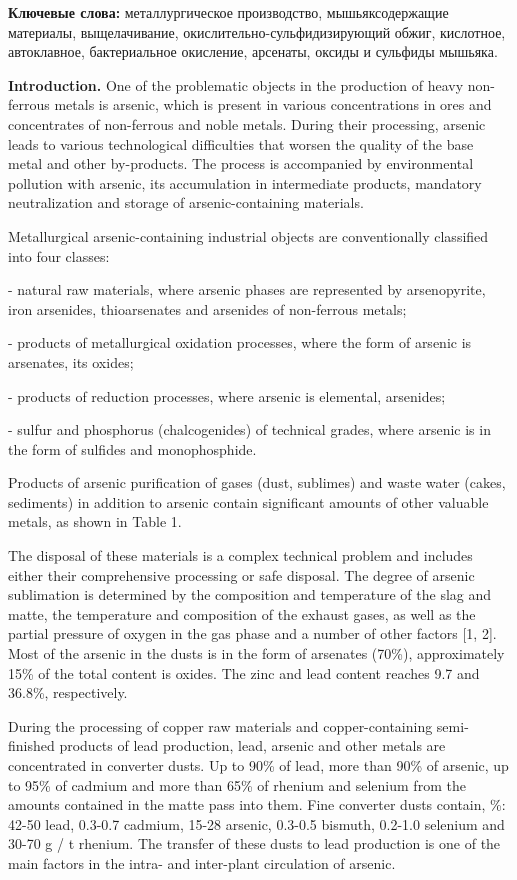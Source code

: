 {\bfseries Ключевые слова:} металлургическое производство, мышьяксодержащие
материалы, выщелачивание, окислительно-сульфидизирующий обжиг,
кислотное, автоклавное, бактериальное окисление, арсенаты, оксиды и
сульфиды мышьяка.

{\bfseries Introduction.} One of the problematic objects in the production
of heavy non-ferrous metals is arsenic, which is present in various
concentrations in ores and concentrates of non-ferrous and noble metals.
During their processing, arsenic leads to various technological
difficulties that worsen the quality of the base metal and other
by-products. The process is accompanied by environmental pollution with
arsenic, its accumulation in intermediate products, mandatory
neutralization and storage of arsenic-containing materials.

Metallurgical arsenic-containing industrial objects are conventionally
classified into four classes:

- natural raw materials, where arsenic phases are represented by
arsenopyrite, iron arsenides, thioarsenates and arsenides of non-ferrous
metals;

- products of metallurgical oxidation processes, where the form of
arsenic is arsenates, its oxides;

- products of reduction processes, where arsenic is elemental,
arsenides;

- sulfur and phosphorus (chalcogenides) of technical grades, where
arsenic is in the form of sulfides and monophosphide.

Products of arsenic purification of gases (dust, sublimes) and waste
water (cakes, sediments) in addition to arsenic contain significant
amounts of other valuable metals, as shown in Table 1.

The disposal of these materials is a complex technical problem and
includes either their comprehensive processing or safe disposal. The
degree of arsenic sublimation is determined by the composition and
temperature of the slag and matte, the temperature and composition of
the exhaust gases, as well as the partial pressure of oxygen in the gas
phase and a number of other factors {[}1, 2{]}. Most of the arsenic in
the dusts is in the form of arsenates (70\%), approximately 15\% of the
total content is oxides. The zinc and lead content reaches 9.7 and
36.8\%, respectively.

During the processing of copper raw materials and copper-containing
semi-finished products of lead production, lead, arsenic and other
metals are concentrated in converter dusts. Up to 90\% of lead, more
than 90\% of arsenic, up to 95\% of cadmium and more than 65\% of
rhenium and selenium from the amounts contained in the matte pass into
them. Fine converter dusts contain, \%: 42-50 lead, 0.3-0.7 cadmium,
15-28 arsenic, 0.3-0.5 bismuth, 0.2-1.0 selenium and 30-70 g / t
rhenium. The transfer of these dusts to lead production is one of the
main factors in the intra- and inter-plant circulation of arsenic.

